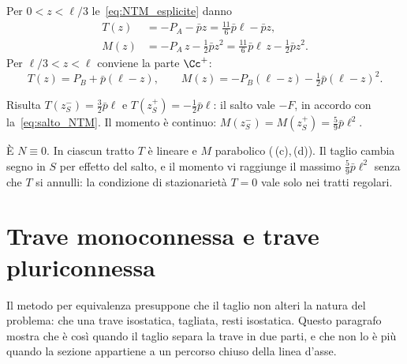 \begin{esempio}
\begin{svolgimento}
		Per $0 < z < \ell/3$ le~\eqref{eq:NTM_esplicite}
		danno
		\begin{align*}
			T(z) &= -P_A - \bar p z = \tfrac{11}{6}\bar p\ell - \bar p z,\\
			M(z) &= -P_A\,z - \tfrac{1}{2}\bar p z^2
			= \tfrac{11}{6}\bar p\ell\,z - \tfrac{1}{2}\bar p z^2.
		\end{align*}
		Per $\ell/3 < z < \ell$ conviene la parte $\Cc^+$:
		\begin{equation*}
			T(z) = P_B + \bar p(\ell - z),
			\qquad
			M(z) = -P_B(\ell - z) - \tfrac{1}{2}\bar p(\ell - z)^2.
		\end{equation*}
		
		Risulta $T(z_S^-) = \tfrac{3}{2}\bar p\ell$ e
		$T(z_S^+) = -\tfrac{1}{2}\bar p\ell$: il salto
		vale $-F$, in accordo con la~\eqref{eq:salto_NTM}.
		Il momento è continuo:
		$M(z_S^-) = M(z_S^+) = \tfrac{5}{9}\bar p\ell^2$.
		
		È $N \equiv 0$. In ciascun tratto $T$ è lineare
		e $M$ parabolico (\,(c),\,(d)).
		Il taglio cambia segno in $S$ per effetto del
		salto, e il momento vi raggiunge il massimo
		$\tfrac{5}{9}\bar p\ell^2$ senza che $T$ si
		annulli: la condizione di stazionarietà
		$T = 0$ vale solo nei tratti regolari.
		
	\end{svolgimento}
\end{esempio}



\section{Trave monoconnessa e trave pluriconnessa}
\label{sec:connessione}

Il metodo per equivalenza presuppone che il taglio non
alteri la natura del problema: che una trave isostatica,
tagliata, resti isostatica. Questo paragrafo mostra che è
così quando il taglio separa la trave in due parti, e
che non lo è più quando la sezione appartiene a un
percorso chiuso della linea d'asse.

